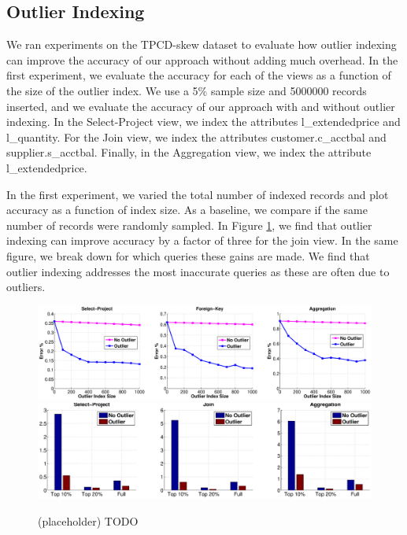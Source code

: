 \subsection{Outlier Indexing}
We ran experiments on the TPCD-skew dataset to evaluate how outlier indexing can improve the accuracy of our approach without adding much overhead.
In the first experiment, we evaluate the accuracy for each of the views as a function of the size of the outlier index. 
We use a 5\% sample size and 5000000 records inserted, and we evaluate the accuracy of our approach with and without outlier indexing.
In the Select-Project view, we index the attributes l\_extendedprice and l\_quantity.
For the Join view, we index the attributes customer.c\_acctbal and supplier.s\_acctbal.
Finally, in the Aggregation view, we index the attribute l\_extendedprice.

In the first experiment, we varied the total number of indexed records and plot accuracy as a function of index size.
As a baseline, we compare if the same number of records were randomly sampled.
In Figure \ref{exp7outlier}, we find that outlier indexing can improve accuracy by a factor of three for the join view. 
In the same figure, we break down for which queries these gains are made. 
We find that outlier indexing addresses the most inaccurate queries as these are often due to outliers. 
\begin{figure}[ht!]
\label{exp7outlier}
\centering
\includegraphics[width=\textwidth]{exp/exp6-outlier.eps}
\includegraphics[width=\textwidth]{exp/exp7-outlier.eps}
 \caption{(placeholder) TODO}
\end{figure}

